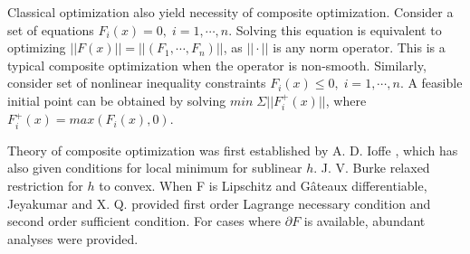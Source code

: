 \documentclass[10pt, oneside]{article}
\begin{document}
Classical optimization also yield necessity of composite optimization. 
Consider a set of equations $F_i(x)=0,\;i=1,\cdots,n$. Solving this equation is equivalent to optimizing $||F(x)||=||(F_1,\cdots,F_n)||$, as $||\cdot||$ is any norm operator\cite{NonlinearEqLp}. This is a typical composite optimization when the operator is non-smooth. Similarly, consider set of nonlinear inequality constraints $F_i(x)\leq 0,\;i=1,\cdots,n$. A feasible initial point can be obtained by solving $min\;\Sigma ||F^+_i(x)||$, where $F^+_i(x)=max(F_i(x),0)$. 
\par



Theory of composite optimization was first established by A. D. Ioffe \cite{IoffeAD1979}, which has also given conditions for local minimum for sublinear $h$. J. V. Burke\cite{BerkeJV1987} relaxed restriction for $h$ to convex. When F is Lipschitz and Gâteaux differentiable, Jeyakumar and X. Q.  \cite{Lagrange} provided first order Lagrange necessary condition and second order sufficient condition. For cases where $\partial F$ is available, abundant analyses were provided\cite{comp21,comp22,comp56}. \par
\end{document}
